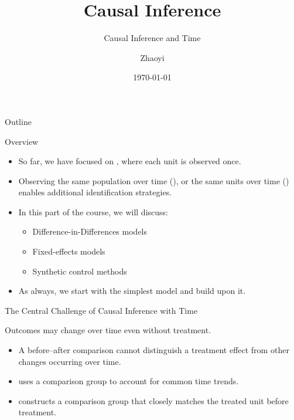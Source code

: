 \documentclass[11pt,aspectratio=169]{beamer}
\title[Causal Inference]{Causal Inference}
\subtitle{Causal Inference and Time}
\author[Zhaoyi]{Zhaoyi}
\date{\today}
\begin{document}
\begin{titleframe}


\end{titleframe}


\begin{frame}{Outline}
\small
\tableofcontents[hideallsubsections]
\end{frame}


\begin{frame}{Overview}
\begin{itemize}
  \item So far, we have focused on , where each unit is observed once.
  \item Observing the same population over time (), or the same units over time () enables additional identification strategies.
  \item In this part of the course, we will discuss:
  \begin{itemize}
    \item Difference-in-Differences models
    \item Fixed-effects models
    \item Synthetic control methods
  \end{itemize}
  \item As always, we start with the simplest model and build upon it.
\end{itemize}
\end{frame}

\begin{frame}{The Central Challenge of Causal Inference with Time}
\begin{importantbox}
Outcomes may change over time even without treatment.
\end{importantbox}
\begin{itemize}
  \item A before--after comparison cannot distinguish a treatment effect from other changes occurring over time.
  \item {} uses a comparison group to account for common time trends.
  \item {} constructs a comparison group that closely matches the treated unit before treatment.
\end{itemize}
\end{frame}
\end{document}
